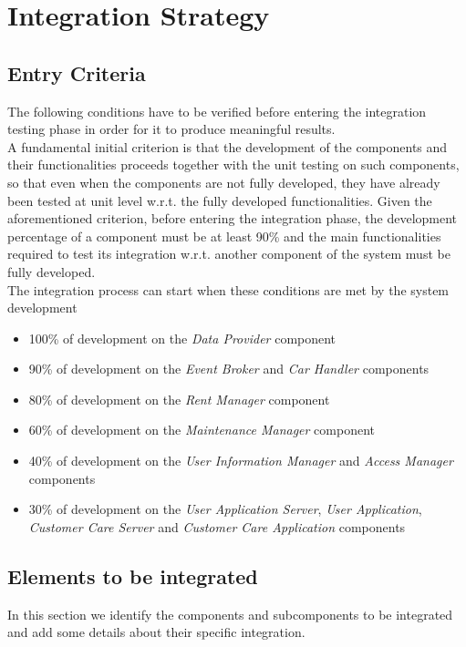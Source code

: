 \section{Integration Strategy}

\subsection{Entry Criteria}
The following conditions have to be verified before entering the integration testing phase in order for it to produce meaningful results.\\

A fundamental initial criterion is that the development of the components and their functionalities proceeds together with the unit testing on such components, so that even when the components are not fully developed, they have already been tested at unit level w.r.t. the fully developed functionalities. 
Given the aforementioned criterion, before entering the integration phase, the development percentage of a component must be at least 90\% and the main functionalities required to test its integration w.r.t. another component of the system must be fully developed.\\

The integration process can start when these conditions are met by the system development
\begin{itemize}
	\item 100\% of development on the \emph{Data Provider} component
	\item 90\% of development on the \emph{Event Broker} and \emph{Car Handler} components
	\item 80\% of development on the \emph{Rent Manager} component
	\item 60\% of development on the \emph{Maintenance Manager} component
	\item 40\% of development on the \emph{User Information Manager} and \emph{Access Manager} components
	\item 30\% of development on the \emph{User Application Server}, \emph{User Application}, \emph{Customer Care Server} and \emph{Customer Care Application} components
\end{itemize}

\subsection{Elements to be integrated}
In this section we identify the components and subcomponents to be integrated and add some details about their specific integration.\\

